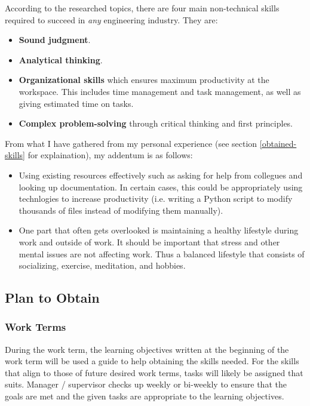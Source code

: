 \documentclass[10pt,letterpaper]{article}
\begin{document}
According to the researched topics, there are four main non-technical skills required to succeed in \textit{any} engineering industry. They are:\\

\begin{itemize}
	\item 
	\textbf{Sound judgment}.

	\item
	\textbf{Analytical thinking}.

	\item
	\textbf{Organizational skills} which ensures maximum productivity at the workspace. This includes time management and task management, as well as giving estimated time on tasks.

	\item
	\textbf{Complex problem-solving} through critical thinking and first principles.
\end{itemize}

From what I have gathered from my personal experience (see section \ref{obtained-skills} for explaination), my addentum is as follows:\\

\begin{itemize}
	\item Using existing resources effectively such as asking for help from collegues and looking up documentation. In certain cases, this could be appropriately using technlogies to increase productivity (i.e. writing a Python script to modify thousands of files instead of modifying them manually).

	\item One part that often gets overlooked is maintaining a healthy lifestyle during work and outside of work. It should be important that stress and other mental issues are not affecting work. Thus a balanced lifestyle that consists of socializing, exercise, meditation, and hobbies.
\end{itemize}

\subsection{Plan to Obtain}

\subsubsection{Work Terms}

During the work term, the learning objectives written at the beginning of the work term will be used a guide to help obtaining the skills needed. For the skills that align to those of future desired work terms, tasks will likely be assigned that suits. Manager / supervisor checks up weekly or bi-weekly to ensure that the goals are met and the given tasks are appropriate to the learning objectives.\\
\end{document}
